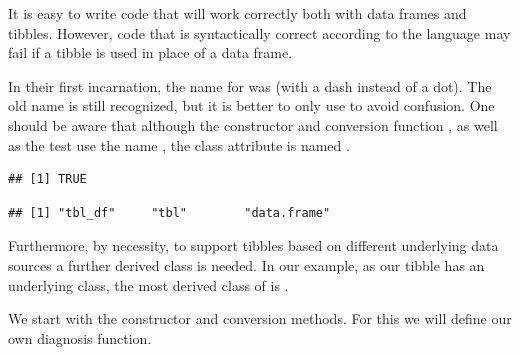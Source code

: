 \documentclass[krantz2]{krantz}\usepackage{knitr}%
\begin{document}
\begin{warningbox}
It is easy to write code that will work correctly both with data frames and tibbles. However, code that is syntactically correct according to the \Rlang language may fail if a tibble is used in place of a data frame.
\end{warningbox}

\begin{infobox}
In their first incarnation, the name for  was  (with a dash instead of a dot). The old name is still recognized, but it is better to only use  to avoid confusion. One should be aware that although the constructor  and conversion function , as well as the test  use the name , the class attribute is named .

\begin{knitrout}\footnotesize
{}\color{fgcolor}\begin{kframe}
\begin{alltt}
 \hlkwb{<-} \hlstd{(} \hlstd{=} \hlopt{:}\hlstd{)}
\end{alltt}


{\ttfamily\noindent\color{warningcolor}{\#\# Warning: `is.tibble()` is deprecated, use `is\_tibble()`.\\\#\# This warning is displayed once per session.}}\begin{verbatim}
## [1] TRUE
\end{verbatim}
\begin{alltt}
\end{alltt}
\begin{verbatim}
## [1] "tbl_df"     "tbl"        "data.frame"
\end{verbatim}
\end{kframe}
\end{knitrout}

Furthermore, by necessity, to support tibbles based on different underlying data sources a further derived class is needed. In our example, as our tibble has an underlying  class, the most derived class of  is .
\end{infobox}

We start with the constructor and conversion methods. For this we will define our own diagnosis function.
\end{document}

